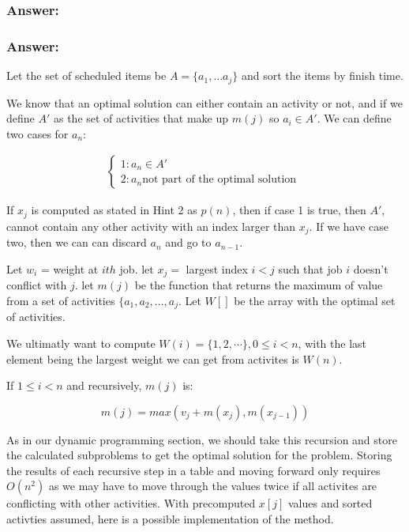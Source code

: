 \documentclass[titlepage]{article}\usepackage[]{graphicx}\usepackage[]{color}
\begin{document}
\subsubsection{Answer: }
\subsubsection{Answer: }

Let the set of scheduled items be $A = \{ a_1, \dots a_j\}$ and sort the
items by finish time. 

We know that an optimal solution can either contain an activity or not, and if
we define $A'$ as the set of activities that make up $m(j)$ so 
$a_i \in A'$. We can define two cases for $a_n$:

  \begin{align*}
	  \begin{cases}
		  1: a_n \in A' \\
		  2: a_n \text{not part of the optimal solution } 
	  \end{cases}
  \end{align*}


  If $x_j$ is computed as stated in Hint 2 as $p(n)$, then if case 1 is true, then $A'$,
  cannot contain any other activity with an index larger than $x_j$. If we have
  case two, then we can can discard $a_n$ and go to $a_{n-1}$. 

Let $w_i$ = weight at $ith$ job. 
let $x_j = $ largest index $i < j $ such that job $i$ doesn't conflict with
$j$. 
let $m(j)$ be the function that returns the maximum of value from a set of
activities
$\{a_1, a_2, \dots, a_j$. 
	Let $W[]$ be the array with the optimal set of activities. 

  We ultimatly want to compute $W(i) = \{ 1,2,\dotsi\}, 0
  \leq i < n$, with the last element being the largest weight we can get from
  activites is $W(n)$. 
  
  If $1\leq i < n$ and 
  recursively, $m(j)$  is:


  \[ m(j) = max \left( v_j + m(x_j), m(x_{j-1}) \right) \]

As in our dynamic programming section, we should take this recursion and store
the calculated subproblems to get the optimal solution for the problem. Storing
the results of each recursive step in a table and moving forward only
requires $O(n^2)$ as we may have to move through the values twice if all
activites are conflicting with other activities. With precomputed $x[j]$ values
and sorted activties assumed, here is a possible implementation of the method.
\end{document}
